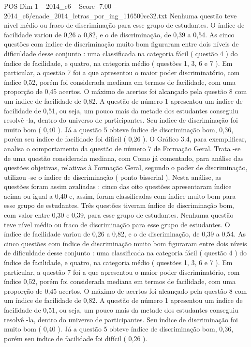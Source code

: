 \begin{textsample}{POS Dim 1 – 2014\_c6 – Score -7.00 – 2014\_c6/enade\_2014\_letras\_por\_ing\_116500ce32.txt}
Nenhuma questão teve nível médio ou fraco de discriminação para esse grupo de estudantes.
O índice de facilidade variou de 0,26 a 0,82, e o de discriminação, de 0,39 a 0,54.
As cinco questões com índice de discriminação muito bom figuraram entre dois níveis de dificuldade desse conjunto : uma classificada na categoria fácil ( questão 4 ) do índice de facilidade, e quatro, na categoria médio ( questões 1, 3, 6 e 7 ).
Em particular, a questão 7 foi a que apresentou o maior poder discriminatório, com índice 0,52, porém foi considerada mediana em termos de facilidade, com uma proporção de 0,45 acertos.
O máximo de acertos foi alcançado pela questão 8 com um índice de facilidade de 0,82.
A questão de número 1 apresentou um índice de facilidade de 0,51, ou seja, um pouco mais da metade dos estudantes conseguiu resolvê -la, dentro do universo de participantes.
Seu índice de discriminação foi muito bom ( 0,40 ).
Já a questão 5 obteve índice de discriminação bom, 0,36, porém seu índice de facilidade foi difícil ( 0,26 ).
O Gráfico 3.4, para exemplificar, analisa o comportamento da questão de número 7 de Formação Geral.
Trata -se de uma questão considerada mediana, com Como já comentado, para análise das questões objetivas, relativas à Formação Geral, segundo o poder de discriminação, utilizou -se o índice de discriminação ( ponto bisserial ).
Nesta análise, as questões foram assim avaliadas : cinco das oito questões apresentaram índice acima ou igual a 0,40 e, assim, foram classificadas com índice muito bom para esse grupo de estudantes.
Três questões tiveram índice de discriminação bom, com valor entre 0,30 e 0,39, para esse grupo de estudantes.
Nenhuma questão teve nível médio ou fraco de discriminação para esse grupo de estudantes.
O índice de facilidade variou de 0,26 a 0,82, e o de discriminação, de 0,39 a 0,54.
As cinco questões com índice de discriminação muito bom figuraram entre dois níveis de dificuldade desse conjunto : uma classificada na categoria fácil ( questão 4 ) do índice de facilidade, e quatro, na categoria médio ( questões 1, 3, 6 e 7 ).
Em particular, a questão 7 foi a que apresentou o maior poder discriminatório, com índice 0,52, porém foi considerada mediana em termos de facilidade, com uma proporção de 0,45 acertos.
O máximo de acertos foi alcançado pela questão 8 com um índice de facilidade de 0,82.
A questão de número 1 apresentou um índice de facilidade de 0,51, ou seja, um pouco mais da metade dos estudantes conseguiu resolvê -la, dentro do universo de participantes.
Seu índice de discriminação foi muito bom ( 0,40 ).
Já a questão 5 obteve índice de discriminação bom, 0,36, porém seu índice de facilidade foi difícil ( 0,26 ).

\end{textsample}

